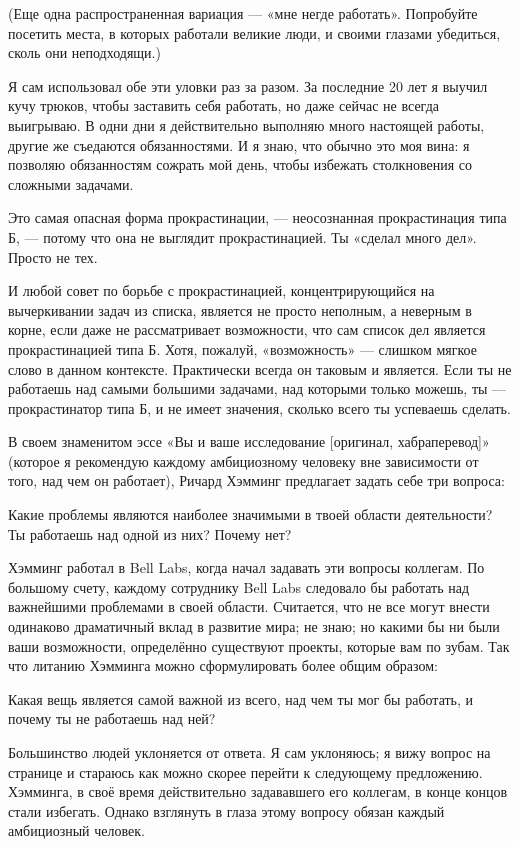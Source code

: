 \documentclass[ebook,12pt,oneside,openany]{memoir}
\begin{document}
(Еще одна распространенная вариация — «мне негде работать». Попробуйте
посетить места, в которых работали великие люди, и своими глазами
убедиться, сколь они неподходящи.)

Я сам использовал обе эти уловки раз за разом. За последние 20 лет я
выучил кучу трюков, чтобы заставить себя работать, но даже сейчас не
всегда выигрываю. В одни дни я действительно выполняю много настоящей
работы, другие же съедаются обязанностями. И я знаю, что обычно это
моя вина: я позволяю обязанностям сожрать мой день, чтобы избежать
столкновения со сложными задачами.

Это самая опасная форма прокрастинации, — неосознанная прокрастинация
типа Б, — потому что она не выглядит прокрастинацией. Ты «сделал много
дел». Просто не тех.

И любой совет по борьбе с прокрастинацией, концентрирующийся на
вычеркивании задач из списка, является не просто неполным, а неверным
в корне, если даже не рассматривает возможности, что сам список дел
является прокрастинацией типа Б. Хотя, пожалуй, «возможность» —
слишком мягкое слово в данном контексте. Практически всегда он таковым
и является. Если ты не работаешь над самыми большими задачами, над
которыми только можешь, ты — прокрастинатор типа Б, и не имеет
значения, сколько всего ты успеваешь сделать.

В своем знаменитом эссе «Вы и ваше исследование [оригинал,
хабраперевод]» (которое я рекомендую каждому амбициозному человеку вне
зависимости от того, над чем он работает), Ричард Хэмминг предлагает
задать себе три вопроса:

Какие проблемы являются наиболее значимыми в твоей области
деятельности? Ты работаешь над одной из них? Почему нет?

Хэмминг работал в Bell Labs, когда начал задавать эти вопросы
коллегам. По большому счету, каждому сотруднику Bell Labs следовало бы
работать над важнейшими проблемами в своей области. Считается, что не
все могут внести одинаково драматичный вклад в развитие мира; не знаю;
но какими бы ни были ваши возможности, определённо существуют проекты,
которые вам по зубам. Так что литанию Хэмминга можно сформулировать
более общим образом:

Какая вещь является самой важной из всего, над чем ты мог бы работать,
и почему ты не работаешь над ней?

Большинство людей уклоняется от ответа. Я сам уклоняюсь; я вижу вопрос
на странице и стараюсь как можно скорее перейти к следующему
предложению. Хэмминга, в своё время действительно задававшего его
коллегам, в конце концов стали избегать. Однако взглянуть в глаза
этому вопросу обязан каждый амбициозный человек.
\end{document}
